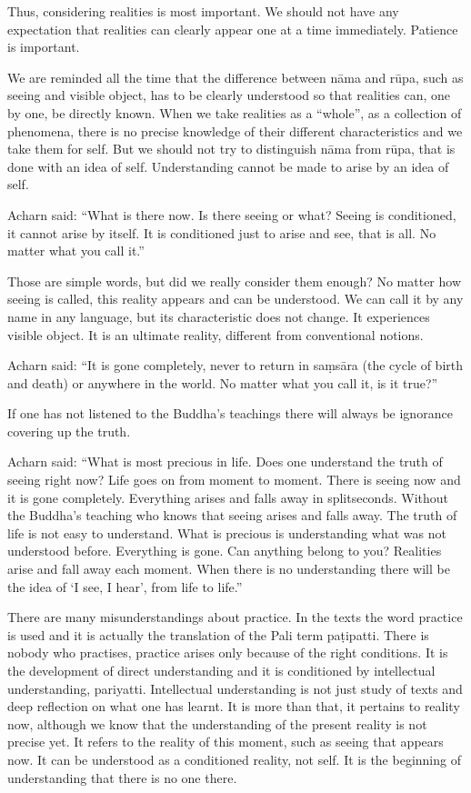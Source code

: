 Thus, considering realities is most important. We should not have any
expectation that realities can clearly appear one at a time immediately.
Patience is important.

We are reminded all the time that the difference between nāma and rūpa,
such as seeing and visible object, has to be clearly understood so that
realities can, one by one, be directly known. When we take realities as
a ``whole'', as a collection of phenomena, there is no precise knowledge
of their different characteristics and we take them for self. But we
should not try to distinguish nāma from rūpa, that is done with an idea
of self. Understanding cannot be made to arise by an idea of self.

Acharn said: ``What is there now. Is there seeing or what? Seeing is
conditioned, it cannot arise by itself. It is conditioned just to arise
and see, that is all. No matter what you call it.''

Those are simple words, but did we really consider them enough? No
matter how seeing is called, this reality appears and can be understood.
We can call it by any name in any language, but its characteristic does
not change. It experiences visible object. It is an ultimate reality,
different from conventional notions.

Acharn said: ``It is gone completely, never to return in saṃsāra (the
cycle of birth and death) or anywhere in the world. No matter what you
call it, is it true?''

If one has not listened to the Buddha's teachings there will always be
ignorance covering up the truth.

Acharn said: ``What is most precious in life. Does one understand the
truth of seeing right now? Life goes on from moment to moment. There is
seeing now and it is gone completely. Everything arises and falls away
in splitseconds. Without the Buddha's teaching who knows that seeing
arises and falls away. The truth of life is not easy to understand. What
is precious is understanding what was not understood before. Everything
is gone. Can anything belong to you? Realities arise and fall away each
moment. When there is no understanding there will be the idea of `I see,
I hear', from life to life.''

There are many misunderstandings about practice. In the texts the word
practice is used and it is actually the translation of the Pali term
paṭipatti. There is nobody who practises, practice arises only because
of the right conditions. It is the development of direct understanding
and it is conditioned by intellectual understanding, pariyatti.
Intellectual understanding is not just study of texts and deep
reflection on what one has learnt. It is more than that, it pertains to
reality now, although we know that the understanding of the present
reality is not precise yet. It refers to the reality of this moment,
such as seeing that appears now. It can be understood as a conditioned
reality, not self. It is the beginning of understanding that there is no
one there.

